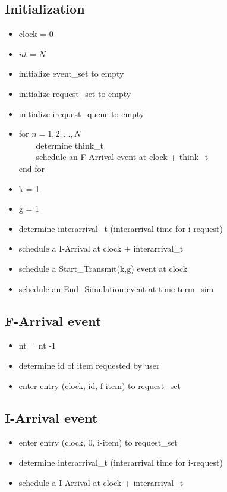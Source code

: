 \documentclass[12pt]{article}
\begin{document}
\subsection{Initialization}
\begin{itemize}
\setlength{\itemsep}{-3mm}
\item clock = 0
\item $nt$ = $N$
\item initialize event\_set to empty
\item initialize request\_set to empty
\item initialize irequest\_queue to empty
\item for $n = 1, 2, \dots, N$\\
\verb!    !determine think\_t\\
\verb!    !schedule an F-Arrival event at clock + think\_t\\
end for
\item k = 1
\item g = 1
\item determine interarrival\_t (interarrival time for i-request)
\item schedule a I-Arrival at clock + interarrival\_t
\item schedule a Start\_Transmit(k,g) event at clock
\item schedule an End\_Simulation event at time term\_sim
\end{itemize}

\subsection{F-Arrival event}
\begin{itemize}
\setlength{\itemsep}{-3mm}
\item nt = nt -1
\item determine id of item requested by user
\item enter entry (clock, id, f-item) to request\_set
\end{itemize}

\subsection{I-Arrival event}
\begin{itemize}
\setlength{\itemsep}{-3mm}
\item enter entry (clock, 0, i-item) to request\_set
\item determine interarrival\_t (interarrival time for i-request)
\item schedule a I-Arrival at clock + interarrival\_t
\end{itemize}
\end{document}
